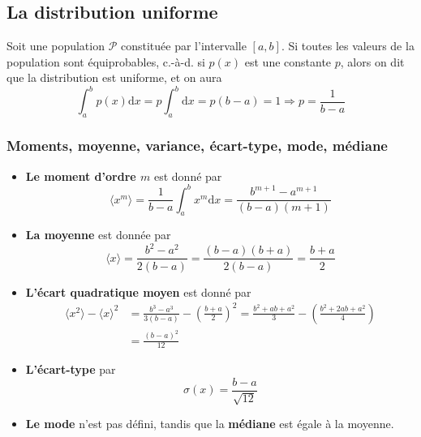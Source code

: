 \subsection{La distribution uniforme}

Soit une population $\mathcal{P}$ constituée par l'intervalle $[a,b]$. Si toutes les valeurs de la population sont équiprobables, c.-à-d. si $p(x)$ est une constante $p$, alors on dit que la distribution est uniforme, et on aura
\begin{equation}
    \int_a^b p(x)\text{d}x=p\int_a^b\text{d}x=p(b-a)=1\Longrightarrow p=\frac{1}{b-a}
\end{equation}

\subsubsection{Moments, moyenne, variance, écart-type, mode, médiane}

\begin{itemize}
    \item \textbf{Le moment d'ordre $m$} est donné par
          \begin{equation}
              \langle x^m\rangle=\frac{1}{b-a}\int_a^b x^m\text{d}x=
              \frac{b^{m+1}-a^{m+1}}{(b-a)(m+1)}
          \end{equation}
    \item \textbf{La moyenne} est donnée par
          \begin{equation}
              \langle x\rangle=\frac{b^2-a^2}{2(b-a)}=\frac{(b-a)(b+a)}{2(b-a)}=\frac{b+a}{2}
          \end{equation}
    \item \textbf{L'écart quadratique moyen} est donné par
          \begin{align}
              \langle x^2\rangle-\langle x\rangle^2 & =\frac{b^3-a^3}{3(b-a)}-\left(\frac{b+a}{2}\right)^2=\frac{b^2+ab+a^2}{3}-\left(\frac{b^2+2ab+a^2}{4}\right)\nonumber \\
                                                    & =\frac{(b-a)^2}{12}
          \end{align}
    \item \textbf{L'écart-type} par
          \begin{equation}
              \sigma(x)=\frac{b-a}{\sqrt{12}}
          \end{equation}
    \item \textbf{Le mode} n'est pas défini, tandis que la \textbf{médiane} est égale à la moyenne.
\end{itemize}

